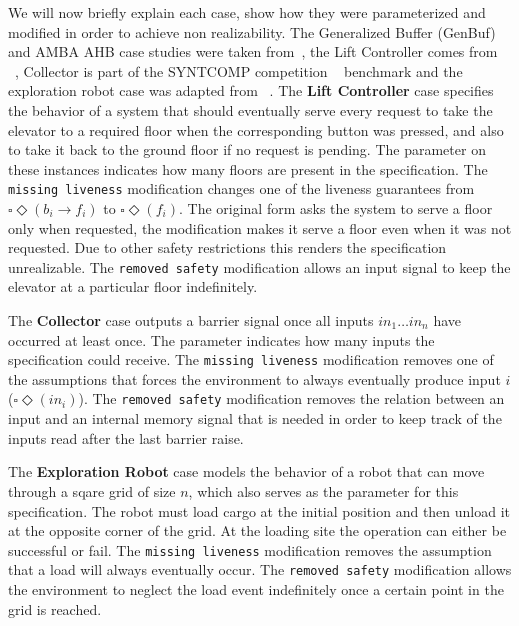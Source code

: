 We will now briefly explain each case, show how they were parameterized and modified in order to achieve non realizability. The Generalized Buffer (GenBuf) and AMBA AHB case studies were taken from~\cite{DBLP:conf/hvc/KonighoferHB10}, the Lift Controller comes from ~\cite{DBLP:conf/fmcad/AlurMT13}, Collector is part of the SYNTCOMP competition ~\cite{SYNTCOMP} benchmark and the exploration robot case was adapted from ~\cite{DBLP:journals/corr/abs-2001-07678}. 
The \textbf{Lift Controller} case specifies the behavior of a system that should eventually serve every request to take the elevator to a required floor when the corresponding button was pressed, and also to take it back to the ground floor if no request is pending. The parameter on these instances indicates how many floors are present in the specification. The \texttt{missing liveness} modification changes one of the liveness guarantees from $\square \Diamond (b_i \rightarrow f_i)$ to $\square \Diamond (f_i)$. The original form asks the system to serve a floor only when requested, the modification makes it serve a floor even when it was not requested. Due to other safety restrictions this renders the specification unrealizable. The \texttt{removed safety} modification allows an input signal to keep the elevator at a particular floor indefinitely.

The \textbf{Collector} case outputs a barrier signal once all inputs $in_1\ldots in_n$ have occurred at least once. The parameter indicates how many inputs the specification could receive. The \texttt{missing liveness} modification removes one of the assumptions that forces the environment to always eventually produce input $i$ ($\square\Diamond(in_i)$). The \texttt{removed safety} modification removes the relation between an input and an internal memory signal that is needed in order to keep track of the inputs read after the last barrier raise.

The \textbf{Exploration Robot} case models the behavior of a robot that can move through a sqare grid of size $n$, which also serves as the parameter for this specification. The robot must load cargo at the initial position and then unload it at the opposite corner of the grid. At the loading site the operation can either be successful or fail. The \texttt{missing liveness} modification removes the assumption that a load will always eventually occur. The \texttt{removed safety} modification allows the environment to neglect the load event indefinitely once a certain point in the grid is reached.

